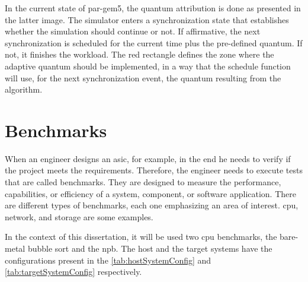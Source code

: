 In the current state of par-gem5, the quantum attribution is done as presented in the latter image. The simulator enters a synchronization state that establishes whether the simulation should continue or not. If affirmative, the next synchronization is scheduled for the current time plus the pre-defined quantum. If not, it finishes the workload. The red rectangle defines the zone where the adaptive quantum should be implemented, in a way that the schedule function will use, for the next synchronization event, the quantum resulting from the algorithm. 

\section{Benchmarks}

When an engineer designs an \gls{asic}, for example, in the end he needs to verify if the project meets the requirements. Therefore, the engineer needs to execute tests that are called benchmarks. They are designed to measure the performance, capabilities, or efficiency of a system, component, or software application. There are different types of benchmarks, each one emphasizing an area of interest. \gls{cpu}, network, and storage are some examples. 

In the context of this dissertation, it will be used two \gls{cpu} benchmarks, the bare-metal bubble sort and the \gls{npb}. The host and the target systems have the configurations present in the \autoref{tab:hostSystemConfig} and \autoref{tab:targetSystemConfig} respectively.   

